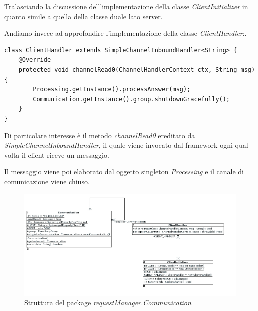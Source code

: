 Tralasciando la discussione dell'implementazione della classe \textit{ClientInitializer} in quanto simile a quella della classe duale lato server.

Andiamo invece ad approfondire l'implementazione della classe \textit{ClientHandler}:.

\begin{lstlisting}[caption={My Caption},captionpos=b]
class ClientHandler extends SimpleChannelInboundHandler<String> {
	@Override
	protected void channelRead0(ChannelHandlerContext ctx, String msg) {
		Processing.getInstance().processAnswer(msg);
		Communication.getInstance().group.shutdownGracefully();
	}
}
\end{lstlisting}

Di particolare interesse è il metodo \textit{channelRead0} ereditato da \textit{SimpleChannelInboundHandler}, il quale viene invocato dal framework ogni qual volta il client riceve un messaggio.

Il messaggio viene poi elaborato dal oggetto singleton \textit{Processing} e il canale di comunicazione viene chiuso.

\begin{figure}[h]
	\includegraphics[width=\textwidth]{Immagini/CommunicationPackageClient}
	\caption{Struttura del package \textit{requestManager.Communication}}
	\label{fig:requestManagerCommunication}
\end{figure}







